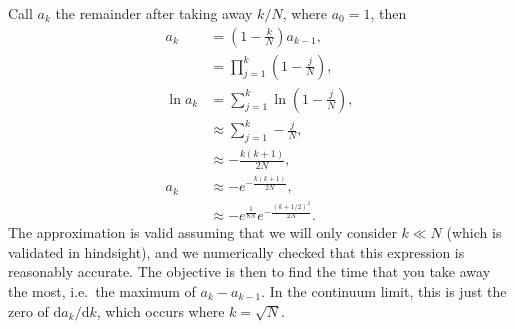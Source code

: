 \documentclass[12pt]{report}
\newcommand*{\rdil}[2]{\mathrm{d}#1 / \mathrm{d}#2}
\newcommand*{\p}[1]{\left(#1\right)}
\begin{document}
Call $a_k$ the remainder after taking away $k / N$, where $a_0 = 1$, then
\begin{align*}
    a_k &= \p{1 - \frac{k}{N}}a_{k - 1},\\
        &= \prod_{j = 1}^k\p{1 - \frac{j}{N}},\\
    \ln a_k &= \sum\limits_{j = 1}^k \ln\p{1 - \frac{j}{N}},\\
        &\approx\sum\limits_{j = 1}^k -\frac{j}{N},\\
        &\approx -\frac{k(k + 1)}{2N},\\
    a_k &\approx -e^{-\frac{k(k + 1)}{2N}},\\
        &\approx -e^{\frac{1}{8N}}e^{-\frac{(k + 1/2)^2}{2N}}.
\end{align*}
The approximation is valid assuming that we will only consider $k \ll N$ (which
is validated in hindsight), and we numerically checked that this expression is
reasonably accurate. The objective is then to find the time that you take away
the most, i.e.\ the maximum of $a_k - a_{k - 1}$. In the continuum limit, this
is just the zero of $\rdil{a_k}{k}$, which occurs where $k = \sqrt{N}$.
\end{document}
